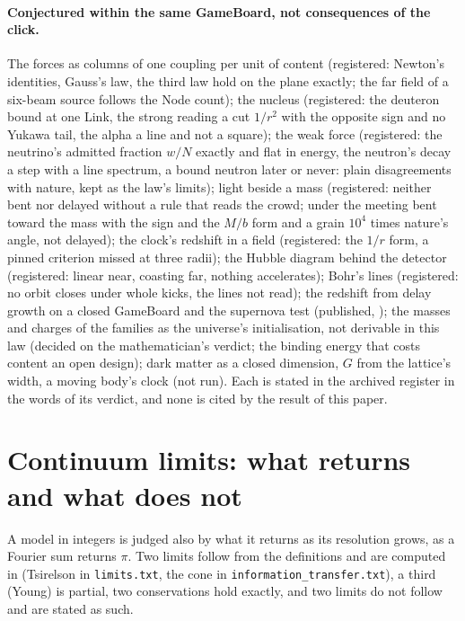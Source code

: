 \documentclass[11pt]{article}
\theoremstyle{definition}
\begin{document}
\paragraph{Conjectured within the same GameBoard, not consequences of the
click.} The forces as columns of one coupling per unit of content
(registered: Newton's identities, Gauss's law, the third law hold on the
plane exactly; the far field of a six-beam source follows the Node
count); the nucleus (registered: the deuteron bound at one Link, the
strong reading a cut $1/r^2$ with the opposite sign and no Yukawa tail,
the alpha a line and not a square); the weak force (registered: the
neutrino's admitted fraction $w/N$ exactly and flat in energy, the
neutron's decay a step with a line spectrum, a bound neutron later or
never: plain disagreements with nature, kept as the law's limits); light
beside a mass (registered: neither bent nor delayed without a rule that
reads the crowd; under the meeting bent toward the mass with the sign and
the $M/b$ form and a grain $10^4$ times nature's angle, not delayed); the
clock's redshift in a field (registered: the $1/r$ form, a pinned
criterion missed at three radii); the Hubble diagram behind the detector
(registered: linear near, coasting far, nothing accelerates); Bohr's
lines (registered: no orbit closes under whole kicks, the lines not
read); the redshift from delay growth on a closed GameBoard and the
supernova test (published, \cite{paper2}); the masses and charges of the
families as the universe's initialisation, not derivable in this law
(decided on the mathematician's verdict; the binding energy that costs
content an open design); dark matter as a closed dimension, $G$ from the
lattice's width, a moving body's clock (not run). Each is stated in the
archived register in the words of its verdict, and none is cited by the
result of this paper.

\section{Continuum limits: what returns and what does not}\label{sec:limits}

A model in integers is judged also by what it returns as its resolution
grows, as a Fourier sum returns $\pi$. Two limits follow from the
definitions and are computed in \cite{checks} (Tsirelson in
\texttt{limits.txt}, the cone in \texttt{information\_transfer.txt}), a
third (Young) is partial, two conservations hold exactly, and two limits
do not follow and are stated as such.
\end{document}
